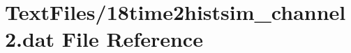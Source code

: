 \hypertarget{18time2histsim__channel2_8dat}{}\section{Text\+Files/18time2histsim\+\_\+channel2.dat File Reference}
\label{18time2histsim__channel2_8dat}
